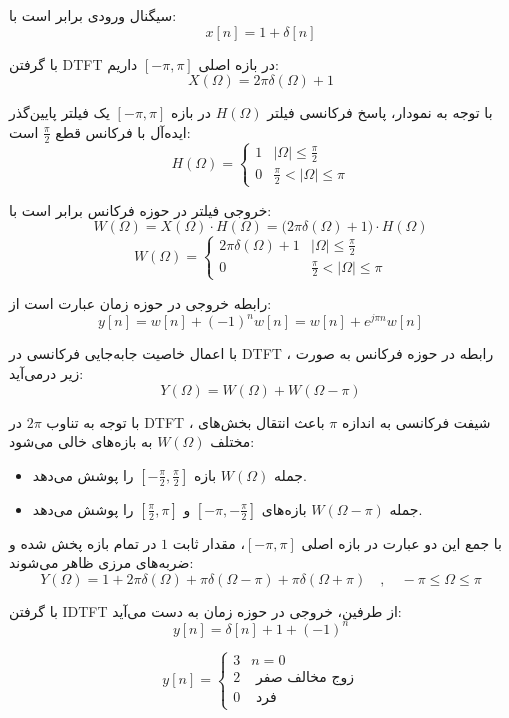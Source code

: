 سیگنال ورودی برابر است با:
\[ x[n] = 1 + \delta[n] \]

با گرفتن DTFT در بازه اصلی $[-\pi, \pi]$ داریم:
\[ X(\Omega) = 2\pi \delta(\Omega) + 1 \]

با توجه به نمودار، پاسخ فرکانسی فیلتر $H(\Omega)$ در بازه $[-\pi, \pi]$ یک فیلتر پایین‌گذر ایده‌آل با فرکانس قطع $\frac{\pi}{2}$ است:
\[ H(\Omega) = \begin{cases} 1 & |\Omega| \le \frac{\pi}{2} \\ 0 & \frac{\pi}{2} < |\Omega| \le \pi \end{cases} \]

خروجی فیلتر در حوزه فرکانس برابر است با:
\[ W(\Omega) = X(\Omega) \cdot H(\Omega) = \big(2\pi \delta(\Omega) + 1\big) \cdot H(\Omega) \]
\[ W(\Omega) = \begin{cases} 2\pi \delta(\Omega) + 1 & |\Omega| \le \frac{\pi}{2} \\ 0 & \frac{\pi}{2} < |\Omega| \le \pi \end{cases} \]

رابطه خروجی در حوزه زمان عبارت است از:
\[ y[n] = w[n] + (-1)^n w[n] = w[n] + e^{j\pi n} w[n] \]

با اعمال خاصیت جابه‌جایی فرکانسی در DTFT ، رابطه در حوزه فرکانس به صورت زیر درمی‌آید:
\[ Y(\Omega) = W(\Omega) + W(\Omega - \pi) \]

با توجه به تناوب $2\pi$ در DTFT ، شیفت فرکانسی به اندازه $\pi$ باعث انتقال بخش‌های مختلف $W(\Omega)$ به بازه‌های خالی می‌شود:
\begin{itemize}
    \item جمله $W(\Omega)$ بازه $[-\frac{\pi}{2}, \frac{\pi}{2}]$ را پوشش می‌دهد.
    \item جمله $W(\Omega - \pi)$ بازه‌های $[-\pi, -\frac{\pi}{2}]$ و $[\frac{\pi}{2}, \pi]$ را پوشش می‌دهد.
\end{itemize}

با جمع این دو عبارت در بازه اصلی $[-\pi, \pi]$، مقدار ثابت $1$ در تمام بازه پخش شده و ضربه‌های مرزی ظاهر می‌شوند:
\[ Y(\Omega) = 1 + 2\pi \delta(\Omega) + \pi \delta(\Omega - \pi) + \pi \delta(\Omega + \pi) \quad , \quad -\pi \le \Omega \le \pi \]

با گرفتن IDTFT از طرفین، خروجی در حوزه زمان به دست می‌آید:
\[ y[n] = \delta[n] + 1 + (-1)^n \]

\[ y[n] = \begin{cases} 3 & n = 0 \\ 2 &  \text{ زوج مخالف صفر} \\ 0 &  \text{ فرد} \end{cases} \]
